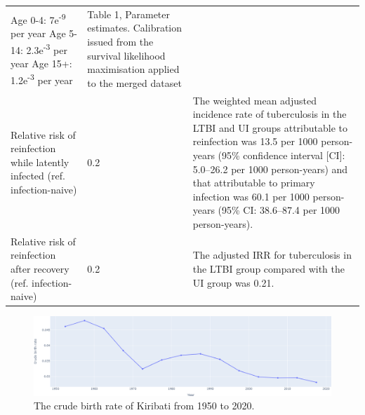 \documentclass{article}
\begin{document}
\begin{table}[!htp]
\begin{tabularx}{\textwidth}{ X  X  X }
\begin{minipage}[t]{0.3\textwidth}
            Age 0-4: 7e\textsuperscript{-9} per year \newline
            Age 5-14: 2.3e\textsuperscript{-3} per year  \newline
            Age 15+: 1.2e\textsuperscript{-3} per year \newline
        \end{minipage}
        &
        \begin{minipage}[t]{0.3\textwidth}
        Table 1, Parameter estimates. Calibration issued from the survival likelihood maximisation applied 
        to the merged dataset \cite{ragonnet-2017}
        \end{minipage} \\
        Relative risk of reinfection while latently infected (ref. infection-naive) & 0.2 &
        \begin{minipage}[t]{0.3\textwidth}
        The weighted mean adjusted incidence rate of tuberculosis in the LTBI and UI 
        groups attributable to reinfection was 13.5 per 1000 person-years
        (95\% confidence interval [CI]: 5.0–26.2 per 1000 person-years) and that 
        attributable to primary infection was 60.1 per 1000 person-years 
        (95\% CI: 38.6–87.4 per 1000 person-years). \cite{andrews-2012}
        \end{minipage} \\
        Relative risk of reinfection after recovery (ref. infection-naive) & 0.2 & \begin{minipage}[t]{0.3\textwidth}
        The adjusted IRR for tuberculosis in the LTBI group compared with the UI group was 0.21. \cite{andrews-2012} 
        \end{minipage} \\
        \hline
	\end{tabularx}
\end{table}

\begin{figure}[!htp]
   \includegraphics[width=\textwidth,keepaspectratio]{images/cbr.png}
    \caption{The crude birth rate of Kiribati from 1950 to 2020.}
    \label{fig:cbr}
\end{figure}
\end{document}
